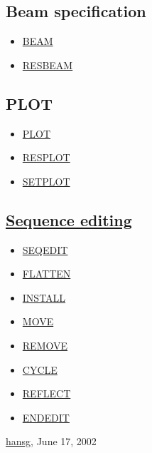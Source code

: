 \subsection{Beam specification}
\begin{itemize}
	\item \href{../Introduction/beam.html}{BEAM}
	\item \href{../Introduction/resbeam.html}{RESBEAM}
\end{itemize}



\subsection{PLOT}
\begin{itemize}
	\item \href{../plot/plot.html}{PLOT}
	\item \href{../plot/plot.html#resplot}{RESPLOT}
	\item \href{../plot/plot.html#setplot}{SETPLOT}
\end{itemize}


\subsection{\href{seqedit.html}{Sequence editing}}
\begin{itemize}
	\item \href{seqedit.html#seqedit}{SEQEDIT}
	\item \href{seqedit.html#flatten}{FLATTEN}
	\item \href{seqedit.html#install}{INSTALL}
	\item \href{seqedit.html#move}{MOVE}
	\item \href{seqedit.html#remove}{REMOVE}
	\item \href{seqedit.html#cycle}{CYCLE}
	\item \href{seqedit.html#reflect}{REFLECT}
	\item \href{seqedit.html#endedit}{ENDEDIT}
\end{itemize}\href{http://www.cern.ch/Hans.Grote/hansg_sign.html}{hansg}, June 17, 2002 






%

